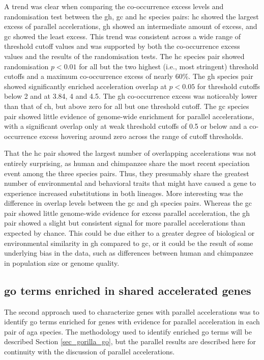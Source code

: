 A trend was clear when comparing the co-occurrence excess levels and
randomisation test \pvs between the \ac{gh}, \ac{gc} and \ac{hc}
species pairs: \ac{hc} showed the largest excess of parallel
accelerations, \ac{gh} showed an intermediate amount of excess, and
\ac{gc} showed the least excess. This trend was consistent across a
wide range of threshold cutoff values and was supported by both the
co-occurrence excess values and the results of the randomisation
tests. The \ac{hc} species pair showed randomisation $p<0.01$ for all
but the two highest (i.e., most stringent) threshold cutoffs and a
maximum co-occurrence excess of nearly 60\%. The \ac{gh} species pair
showed significantly enriched acceleration overlap at $p<0.05$ for
threshold cutoffs below 2 and at 3.84, 4 and 4.5. The \ac{gh}
co-occurrence excess was noticeably lower than that of \ac{ch}, but
above zero for all but one threshold cutoff. The \ac{gc} species pair
showed little evidence of genome-wide enrichment for parallel
accelerations, with a significant overlap only at weak threshold
cutoffs of 0.5 or below and a co-occurrence excess hovering around
zero across the range of cutoff thresholds.

That the \ac{hc} pair showed the largest number of overlapping
accelerations was not entirely surprising, as human and chimpanzee
share the most recent speciation event among the three species
pairs. Thus, they presumably share the greatest number of
environmental and behavioral traits that might have caused a gene to
experience increased \nsyn substitutions in both lineages. More
interesting was the difference in overlap levels between the \ac{gc}
and \ac{gh} species pairs. Whereas the \ac{gc} pair showed little
genome-wide evidence for excess parallel acceleration, the \ac{gh}
pair showed a slight but consistent signal for more parallel
accelerations than expected by chance. This could be due either to a
greater degree of biological or environmental similarity in \ac{gh}
compared to \ac{gc}, or it could be the result of some underlying bias
in the data, such as differences between human and chimpanzee in
population size or genome quality.

\subsection{\ac{go} terms enriched in shared accelerated genes}

The second approach used to characterize genes with parallel
accelerations was to identify \ac{go} terms enriched for genes with
evidence for parallel acceleration in each pair of \ac{aga}
species. The methodology used to identify enriched \ac{go} terms will
be described Section \ref{sec_gorilla_go}, but the parallel results
are described here for continuity with the discussion of parallel
accelerations.

